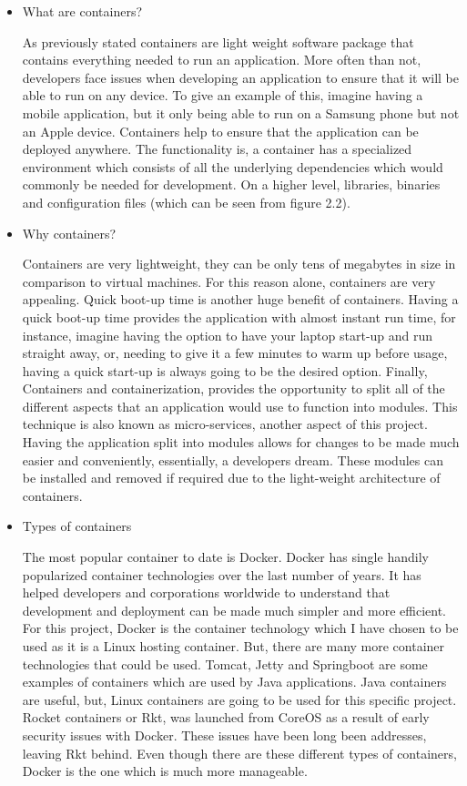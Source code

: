 \begin{itemize}
    \item What are containers?
    
    As previously stated containers are light weight software package that contains everything needed to run an application. More often than not, developers face issues when developing an application to ensure that it will be able to run on any device. To give an example of this, imagine having a mobile application, but it only being able to run on a Samsung phone but not an Apple device. Containers help to ensure that the application can be deployed anywhere. The functionality is, a container has a specialized environment which consists of all the underlying dependencies which would commonly be needed for development. On a higher level, libraries, binaries and configuration files (which can be seen from figure 2.2).
    
    \item Why containers?
    
    Containers are very lightweight, they can be only tens of megabytes in size in comparison to virtual machines. For this reason alone, containers are very appealing. Quick boot-up time is another huge benefit of containers. Having a quick boot-up time provides the application with almost instant run time, for instance, imagine having the option to have your laptop start-up and run straight away, or, needing to give it a few minutes to warm up before usage, having a quick start-up is always going to be the desired option. Finally, Containers and containerization, provides the opportunity to split all of the different aspects that an application would use to function into modules. This technique is also known as micro-services, another aspect of this project. Having the application split into modules allows for changes to be made much easier and conveniently, essentially, a developers dream. These modules can be installed and removed if required due to the light-weight architecture of containers.
    
    \item Types of containers
    
    The most popular container to date is Docker. Docker has single handily popularized container technologies over the last number of years. It has helped developers and corporations worldwide to understand that development and deployment can be made much simpler and more efficient. For this project, Docker is the container technology which I have chosen to be used as it is a Linux hosting container. But, there are many more container technologies that could be used. Tomcat, Jetty and Springboot are some examples of containers which are used by Java applications. Java containers are useful, but, Linux containers are going to be used for this specific project. Rocket containers or Rkt, was launched from CoreOS as a result of early security issues with Docker. These issues have been long been addresses, leaving Rkt behind. Even though there are these different types of containers, Docker is the one which is much more manageable.
    

\end{itemize}

